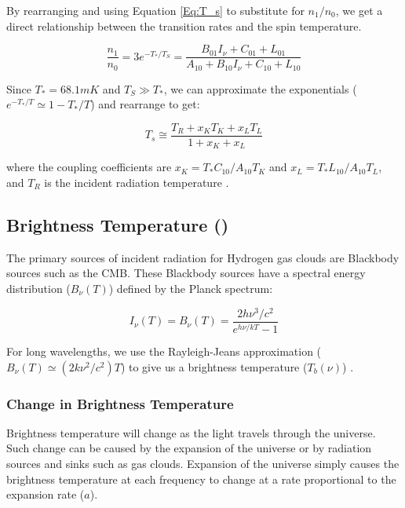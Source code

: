 By rearranging and using Equation \ref{Eq:T_s} to substitute for $n_1/n_0$, we get a direct relationship between the transition rates and the spin temperature. 

\begin{equation}
\frac{n_1}{n_0} = 3 e^{-T_*/T_S} = \frac{B_{01} I_\nu + C_{01}+ L_{01}}{A_{10}+ B_{10} I_\nu + C_{10} +L_{10}}
\end{equation}

Since $T_* = 68.1 mK$ and $T_S \gg T_*$, we can approximate the exponentials ($e^{-T_*/T} \simeq 1-T_*/T$) and rearrange to get:

\begin{equation}\label{Eq:dT_s}
T_s \cong \frac{T_{R} + x_K T_{K} + x_{L} T_{L}}{1+x_K +x_{L}}
\end{equation}

where the coupling coefficients are $x_K = T_* C_{10}/A_{10} T_K$ and $x_L = T_* L_{10} / A_{10} T_L$, and $T_R$ is the incident radiation temperature \cite{field_1958}.

\subsection{Brightness Temperature (\tb)}

The primary sources of incident radiation for Hydrogen gas clouds are Blackbody sources such as the CMB. These Blackbody sources have a spectral energy distribution ($B_\nu (T)$) defined by the Planck spectrum:

\begin{equation}
I_{\nu} (T) = B_{\nu}(T) = \frac{ 2 h \nu^3 / c^2}{e^{h \nu / k T}-1}
\end{equation}

For long wavelengths, we use the Rayleigh-Jeans approximation ($B_{\nu} (T) \simeq (2 k \nu^2 / c^2) T$) to give us a brightness temperature ($T_b (\nu)$) \cite{carroll2007}. 

\subsubsection{Change in Brightness Temperature}

Brightness temperature will change as the light travels through the universe. Such change can be caused by the expansion of the universe or by radiation sources and sinks such as gas clouds. Expansion of the universe simply causes the brightness temperature at each frequency to change at a rate proportional to the expansion rate ($a$). 

